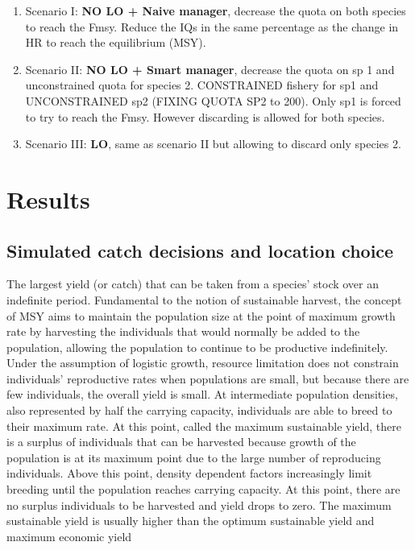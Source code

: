 \documentclass[12pt,oneline,a4paper,numbib]{ouparticle}
\begin{document}
\begin{enumerate}

\item
Scenario I: \textbf{NO LO + Naive manager},  decrease the quota on both species to reach the Fmsy.
Reduce the IQs in the same percentage as the change in HR to reach the equilibrium (MSY). 

\item 
Scenario II: \textbf{NO LO + Smart manager}, decrease the quota on sp 1 and unconstrained quota for species 2.
CONSTRAINED fishery for sp1 and UNCONSTRAINED sp2 (FIXING QUOTA SP2 to 200). Only sp1 is forced to try to reach the Fmsy. However discarding is allowed for both species.

\item
Scenario III: \textbf{LO}, same as scenario II but allowing to discard only species 2.

\end{enumerate}


\section{Results}
\label{sec3}


\subsection{Simulated catch decisions and location choice}
\label{sec3.1}

The largest yield (or catch) that can be taken from a species' stock over an indefinite period. Fundamental to the notion of sustainable harvest, the concept of MSY aims to maintain the population size at the point of maximum growth rate by harvesting the individuals that would normally be added to the population, allowing the population to continue to be productive indefinitely. Under the assumption of logistic growth, resource limitation does not constrain individuals’ reproductive rates when populations are small, but because there are few individuals, the overall yield is small. At intermediate population densities, also represented by half the carrying capacity, individuals are able to breed to their maximum rate. At this point, called the maximum sustainable yield, there is a surplus of individuals that can be harvested because growth of the population is at its maximum point due to the large number of reproducing individuals. Above this point, density dependent factors increasingly limit breeding until the population reaches carrying capacity. At this point, there are no surplus individuals to be harvested and yield drops to zero. The maximum sustainable yield is usually higher than the optimum sustainable yield and maximum economic yield
\end{document}
